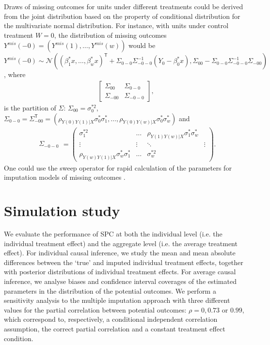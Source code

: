 	Draws of missing outcomes for units under different treatments could be derived from the joint distribution based on the property of conditional distribution for the multivariate normal distribution. For instance, with units under control treatment $W = 0$, the distribution of missing outcomes $Y^{mis}(-0) = (Y^{mis}(1), \dots, Y^{mis}(w))$ would be $Y^{mis}(-0) \sim \mathcal{N} ((\beta^{*}_{1}x, \dots, \beta^{*}_{w}x)^{\mathsf{T}} + \Sigma_{0-0}\Sigma_{-0-0}^{-1}(Y_0 - \beta^{*}_{0}x), \Sigma_{00} - \Sigma_{0-0}\Sigma_{-0-0}^{-1}\Sigma_{-00})$, where
	\begin{eqnarray}
		\left[\begin{array}{cc}
			\Sigma_{00} & \Sigma_{0-0}\\
			\Sigma_{-00} & \Sigma_{-0-0}
		\end{array}\right],
	\end{eqnarray}
	is the partition of $\Sigma$: $\Sigma_{00} = \sigma^{*2}_{0}$, $\Sigma_{0-0} = \Sigma_{-00}^{\mathsf{T}} = (\rho_{Y(0)Y(1)|X}\sigma^{*}_{0}\sigma^{*}_{1}, \dots, \rho_{Y(0)Y(w)|X}\sigma^{*}_{0}\sigma^{*}_{w})$ and 
	\begin{eqnarray}
		\begin{array}{c}
			\Sigma_{-0-0}
		\end{array} = \left(\begin{array}{cccc}
			\sigma^{*2}_{1} & \dots & \rho_{Y(1)Y(w)|X}\sigma^{*}_{1}\sigma^{*}_{w}\\
			\vdots & \vdots & \ddots & \vdots\\
			\rho_{Y(w)Y(1)|X}\sigma^{*}_{w}\sigma^{*}_{1} & \dots & \sigma^{*2}_{w}
		\end{array}\right).
	\end{eqnarray} 
	One could use the sweep operator for rapid calculation of the parameters for imputation models of missing outcomes \citep{goodnight1979tutorial}. 
	
	\section{Simulation study}
	\label{sec:4.5}
	We evaluate the performance of SPC at both the individual level (i.e. the individual treatment effect) and the aggregate level (i.e. the average treatment effect). For individual causal inference, we study the mean and mean absolute differences between the `true' and imputed individual treatment effects, together with posterior distributions of individual treatment effects. For average causal inference, we analyse biases and confidence interval coverages of the estimated parameters in the distribution of the potential outcomes. We perform a sensitivity analysis to the multiple imputation approach with three different values for the partial correlation between potential outcomes: $\rho = 0, 0.73 $ or $0.99$, which correspond to, respectively, a conditional independent correlation assumption, the correct partial correlation and a constant treatment effect condition. 
	
